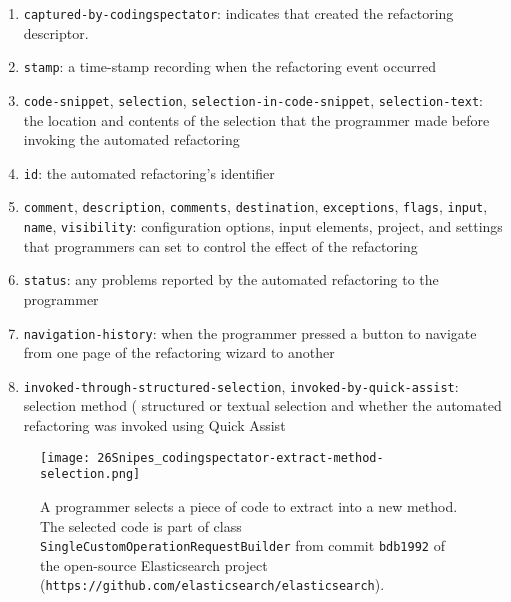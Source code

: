 \begin{enumerate}

\item \texttt{captured-by-codingspectator}: indicates that \CodingSpectator{}
  created the refactoring descriptor.

\item \texttt{stamp}: a time-stamp recording when the refactoring event occurred

\item \texttt{code-snippet}, \texttt{selection},
  \texttt{selection-in-code-snippet}, \texttt{selection-text}: the location and
  contents of the selection that the programmer made before invoking the
  automated refactoring

\item \texttt{id}: the automated refactoring's identifier

\item \texttt{comment}, \texttt{description}, \texttt{comments},
  \texttt{destination}, \texttt{exceptions}, \texttt{flags}, \texttt{input},
  \texttt{name}, \texttt{visibility}: configuration options, \eg{} input
  elements, project, and settings that programmers can set to control the effect
  of the refactoring

\item \texttt{status}: any problems reported by the automated refactoring to the
  programmer

\item \texttt{navigation-history}: when the programmer pressed a button to
  navigate from one page of the refactoring wizard to another

\item \texttt{invoked-through-structured-selection},
  \texttt{invoked-by-quick-assist}: selection method (\eg{} structured or
  textual selection and whether the automated refactoring was invoked using
  Quick Assist

\end{enumerate}

\begin{figure}
%
\centering
%
\texttt{[image: 26Snipes\_codingspectator-extract-method-selection.png]}
%
\caption{\label{FigCodingSpectatorExtractMethodSelectionExample}A programmer
selects a piece of code to extract into a new method. The selected code is part
of class \texttt{SingleCustomOperationRequestBuilder} from commit
\texttt{bdb1992} of the open-source Elasticsearch project
(\texttt{https://github.com/elasticsearch/elasticsearch}).}
%
\end{figure}

